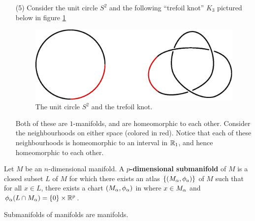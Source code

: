 \begin{example}
\begin{enumerate}
             \item[(5)] Consider the unit circle $S^2$ and the following
                 ``trefoil knot'' $K_3$ pictured below in figure \ref{figure_1.3}
                 \begin{figure}[h]
                     \centering
                     \includegraphics[scale=0.5]{Figures/Chapter1/circle_to_trefoil.eps}
                     \caption{The unit circle $S^2$ and the trefoil knot.}
                     \label{figure_1.3}
                 \end{figure}
                 Both of these are $1$-manifolds, and are homeomorphic to each
                 other. Consider the neighbourhoods on either space  (colored in
                 red). Notice that each of these neighbourhoods is homeomorphic
                 to an interval in $\mathbb{R}_1$, and hence homeomorphic to each other.
    \end{enumerate}
\end{example}

\begin{definition}
    Let $M$ be an  $n$-dimensional manifold. A  \textbf{$p$-dimensional
    submanifold} of $M$ is a closed subset  $L$ of  $M$ for which there exists
    an atlas  $\{(M_\alpha,\phi_a)\}$ of $M$ such that for all  $x \in L$, there
    exists a chart  $(M_\alpha,\phi_\alpha)$ in where $x \in M_\alpha$ and  $\phi_\alpha(L \cap
    M_\alpha)=\{0\} \times \mathbb{R}^p$.
\end{definition}

\begin{lemma}\label{1.1.1}
    Submanifolds of manifolds are manifolds.
\end{lemma}

